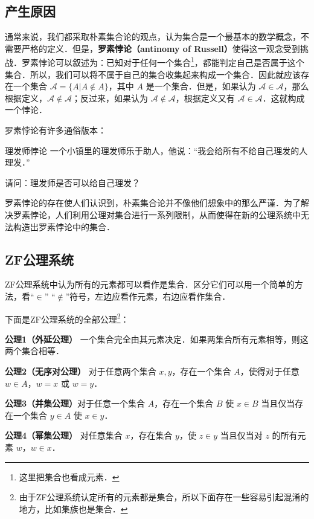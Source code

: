 \begin{issues}
\issueTODO
\end{issues}

\subsection{产生原因}
通常来说，我们都采取朴素集合论的观点，认为集合是一个最基本的数学概念，不需要严格的定义．但是，\textbf{罗素悖论（antinomy of Russell）}使得这一观念受到挑战．罗素悖论可以叙述为：已知对于任何一个集合\footnote{这里把集合也看成元素．}，都能判定自己是否属于这个集合．所以，我们可以将不属于自己的集合收集起来构成一个集合．因此就应该存在一个集合 $\mathcal{A}=\{A|A\notin A\}$，其中 $A$ 是一个集合．但是，如果认为 $\mathcal{A}\in\mathcal{A}$，那么根据定义，$\mathcal{A}\notin\mathcal{A}$；反过来，如果认为 $\mathcal{A}\notin\mathcal{A}$，根据定义又有 $\mathcal{A}\in\mathcal{A}$．这就构成一个悖论．

罗素悖论有许多通俗版本：
\begin{example}{理发师悖论}
一个小镇里的理发师乐于助人，他说：“我会给所有不给自己理发的人理发．”

请问：理发师是否可以给自己理发？
\end{example}

罗素悖论的存在使人们认识到，朴素集合论并不像他们想象中的那么严谨．为了解决罗素悖论，人们利用公理对集合进行一系列限制，从而使得在新的公理系统中无法构造出罗素悖论中的集合．

\subsection{ZF公理系统}
ZF公理系统中认为所有的元素都可以看作是集合．区分它们可以用一个简单的方法，看“$\in$” “$\notin$”符号，左边应看作元素，右边应看作集合．

下面是ZF公理系统的全部公理\footnote{由于ZF公理系统认定所有的元素都是集合，所以下面存在一些容易引起混淆的地方，比如集族也是集合．}：

\textbf{公理1（外延公理）} 一个集合完全由其元素决定．如果两集合所有元素相等，则这两个集合相等．

\textbf{公理2（无序对公理）} 对于任意两个集合 $x,y$，存在一个集合 $A$，使得对于任意 $w\in A$，$w=x$ 或 $w=y$．

\textbf{公理3（并集公理）}对于任意一个集合 $A$，存在一个集合 $B$ 使 $x\in B$ 当且仅当存在一个集合 $y\in A$ 使 $x\in y$．

\textbf{公理4（幂集公理）} 对任意集合 $x$，存在集合 $y$，使 $z\in y$ 当且仅当对 $z$ 的所有元素 $w$，$w\in x$．


